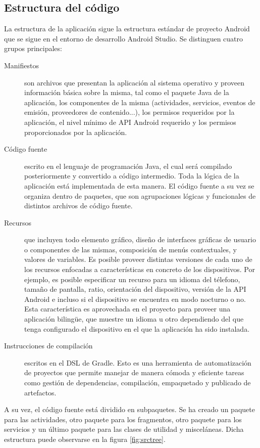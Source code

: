 \subsection{Estructura del código}
\label{sec:estructura}
La estructura de la aplicación sigue la estructura estándar de proyecto Android que se sigue en el entorno de desarrollo Android Studio. Se distinguen cuatro grupos principales:
\begin{description}
\item[Manifiestos] son archivos que presentan la aplicación al sistema operativo y proveen información básica sobre la misma, tal como el paquete Java de la aplicación, los componentes de la misma (actividades, servicios, eventos de emisión, proveedores de contenido...), los permisos requeridos por la aplicación, el nivel mínimo de \ac{API} Android requerido y los permisos proporcionados por la aplicación.
\item[Código fuente] escrito en el lenguaje de programación Java, el cual será compilado posteriormente y convertido a código intermedio. Toda la lógica de la aplicación está implementada de esta manera. El código fuente a su vez se organiza dentro de paquetes, que son agrupaciones lógicas y funcionales de distintos archivos de código fuente.
\item[Recursos] que incluyen todo elemento gráfico, diseño de interfaces gráficas de usuario o componentes de las mismas, composición de menús contextuales, y valores de variables. Es posible proveer distintas versiones de cada uno de los recursos enfocadas a características en concreto de los dispositivos. Por ejemplo, es posible especificar un recurso para un idioma del télefono, tamaño de pantalla, ratio, orientación del dispositivo, versión de la API Android e incluso si el dispositivo se encuentra en modo nocturno o no. Esta característica es aprovechada en el proyecto para proveer una aplicación bilingüe, que muestre un idioma u otro dependiendo del que tenga configurado el dispositivo en el que la aplicación ha sido instalada.
\item[Instrucciones de compilación] escritos en el \ac{DSL} de Gradle. Esto es una herramienta de automatización de proyectos que permite manejar de manera cómoda y eficiente tareas como gestión de dependencias, compilación, empaquetado y publicado de artefactos.
\end{description}
 
 A su vez, el código fuente está dividido en subpaquetes. Se ha creado un paquete para las actividades, otro paquete para los fragmentos, otro paquete para los servicios y un último paquete para las clases de utilidad y misceláneas. Dicha estructura puede observarse en la figura \ref{fig:srctree}.
 
